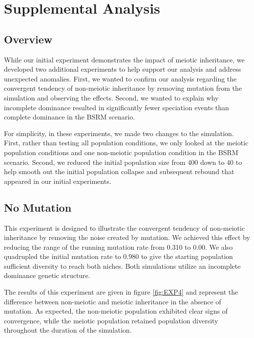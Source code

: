 \documentclass{article}
\begin{document}
\section{Supplemental Analysis}

\subsection{Overview}

While our initial experiment demonstrates the impact of meiotic inheritance, we developed two additional experiments to help support our analysis and address unexpected anomalies. First, we wanted to confirm our analysis regarding the convergent tendency of non-meiotic inheritance by removing mutation from the simulation and observing the effects. Second, we wanted to explain why incomplete dominance resulted in significantly fewer speciation events than complete dominance in the BSRM scenario. 

For simplicity, in these experiments, we made two changes to the simulation. First, rather than testing all population conditions, we only looked at the meiotic population conditions and one non-meiotic population condition in the BSRM scenario. Second, we reduced the initial population size from 400 down to 40 to help smooth out the initial population collapse and subsequent rebound that appeared in our initial experiments.



\subsection{No Mutation}

This experiment is designed to illustrate the convergent tendency of non-meiotic inheritance by removing the noise created by mutation. We achieved this effect by reducing the range of the running mutation rate from 0.310 to 0.00. We also quadrupled the initial mutation rate to 0.980 to give the starting population sufficient diversity to reach both niches. Both simulations utilize an incomplete dominance genetic structure. 

The results of this experiment are given in figure \ref{fig:EXP4} and represent the difference between non-meiotic and meiotic inheritance in the absence of mutation. As expected, the non-meiotic population exhibited clear signs of convergence, while the meiotic population retained population diversity throughout the duration of the simulation. 
\end{document}

